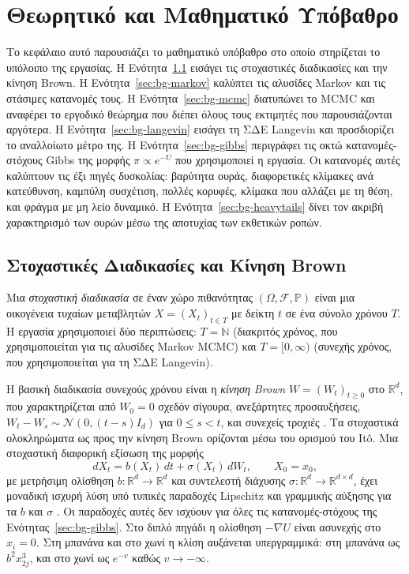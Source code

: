 \chapter{Θεωρητικό και Μαθηματικό Υπόβαθρο}
\label{chap:background}

Το κεφάλαιο αυτό παρουσιάζει το μαθηματικό υπόβαθρο στο οποίο στηρίζεται το
υπόλοιπο της εργασίας. Η Ενότητα~\ref{sec:bg-stochastic} εισάγει τις
στοχαστικές διαδικασίες και την κίνηση Brown. Η Ενότητα~\ref{sec:bg-markov}
καλύπτει τις αλυσίδες Markov και τις στάσιμες κατανομές τους. Η
Ενότητα~\ref{sec:bg-mcmc} διατυπώνει το MCMC και αναφέρει το εργοδικό θεώρημα
που διέπει όλους τους εκτιμητές που παρουσιάζονται αργότερα. Η
Ενότητα~\ref{sec:bg-langevin} εισάγει τη ΣΔΕ Langevin και προσδιορίζει το
αναλλοίωτο μέτρο της. Η Ενότητα~\ref{sec:bg-gibbs} περιγράφει τις οκτώ κατανομές-στόχους Gibbs της
μορφής $\pi \propto e^{-U}$ που χρησιμοποιεί η εργασία. Οι κατανομές αυτές καλύπτουν τις έξι πηγές
δυσκολίας: βαρύτητα ουράς, διαφορετικές κλίμακες ανά κατεύθυνση,
καμπύλη συσχέτιση, πολλές κορυφές, κλίμακα που αλλάζει με τη θέση, και φράγμα με
μη λείο δυναμικό. Η Ενότητα~\ref{sec:bg-heavytails} δίνει τον ακριβή χαρακτηρισμό
των ουρών μέσω της αποτυχίας των εκθετικών ροπών.

\section{Στοχαστικές Διαδικασίες και Κίνηση Brown}
\label{sec:bg-stochastic}

Μια \emph{στοχαστική διαδικασία} σε έναν χώρο πιθανότητας $(\Omega, \mathcal{F},
\mathbb{P})$ είναι μια οικογένεια τυχαίων μεταβλητών $X = (X_t)_{t \in T}$
με δείκτη $t$ σε ένα σύνολο χρόνου $T$. Η εργασία χρησιμοποιεί δύο περιπτώσεις:
$T = \mathbb{N}$ (διακριτός χρόνος, που χρησιμοποιείται για
τις αλυσίδες Markov MCMC) και $T = [0, \infty)$ (συνεχής χρόνος, που
χρησιμοποιείται για τη ΣΔΕ Langevin).

Η βασική διαδικασία συνεχούς χρόνου είναι η \emph{κίνηση Brown}
$W = (W_t)_{t\geq 0}$ στο $\mathbb{R}^d$, που χαρακτηρίζεται από $W_0 = 0$
σχεδόν σίγουρα, ανεξάρτητες προσαυξήσεις, $W_t - W_s \sim \mathcal{N}(0, (t-s) I_d)$
για $0 \le s < t$, και συνεχείς τροχιές
\citep{karatzas1991brownian}. Τα στοχαστικά ολοκληρώματα ως προς την κίνηση Brown
ορίζονται μέσω του ορισμού του It\^o. Μια στοχαστική διαφορική εξίσωση της μορφής
\begin{equation}
  dX_t = b(X_t)\, dt + \sigma(X_t)\, dW_t,
  \qquad X_0 = x_0,
  \label{eq:generic-sde}
\end{equation}
με μετρήσιμη ολίσθηση $b: \mathbb{R}^d \to \mathbb{R}^d$ και συντελεστή
διάχυσης $\sigma: \mathbb{R}^d \to \mathbb{R}^{d \times d}$, έχει μοναδική ισχυρή
λύση υπό τυπικές παραδοχές Lipschitz και γραμμικής αύξησης για τα $b$ και
$\sigma$ \citep{oksendal2003stochastic}. Οι παραδοχές αυτές δεν ισχύουν για όλες τις
κατανομές-στόχους της Ενότητας~\ref{sec:bg-gibbs}. Στο διπλό πηγάδι η ολίσθηση
$-\nabla U$ είναι ασυνεχής στο $x_i = 0$. Στη μπανάνα και στο χωνί η κλίση αυξάνεται
υπεργραμμικά: στη μπανάνα ως $b^2 x_{2j}^3$, και στο χωνί ως $e^{-v}$ καθώς
$v \to -\infty$.

